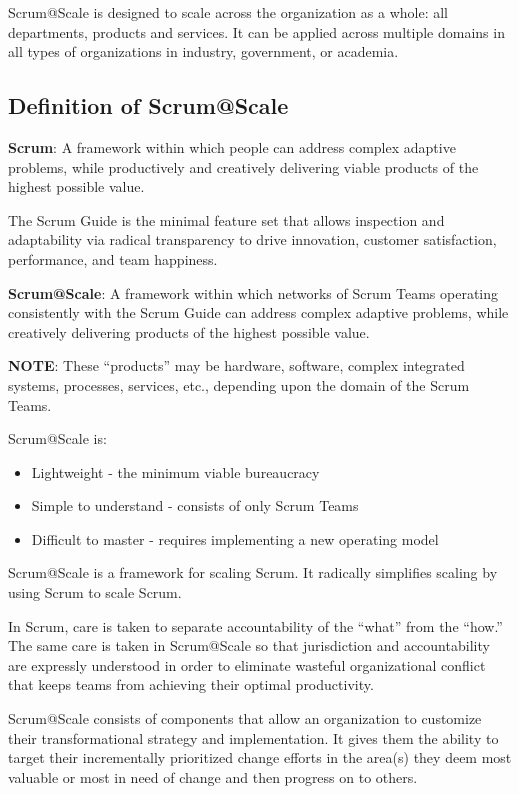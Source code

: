 \documentclass[12pt,a4paper,parskip=full]{scrartcl}
\begin{document}
Scrum@Scale is designed to scale across the organization as a whole: all departments, products and services. It can be applied across multiple domains in all types of organizations in industry, government, or academia.

\subsection{Definition of Scrum@Scale}

\textbf{Scrum}: A framework within which people can address complex adaptive problems, while productively and creatively delivering viable products of the highest possible value.

The Scrum Guide is the minimal feature set that allows inspection and adaptability via radical transparency to drive innovation, customer satisfaction, performance, and team happiness.

\textbf{Scrum@Scale}: A framework within which networks of Scrum Teams operating consistently with the Scrum Guide can address complex adaptive problems, while creatively delivering products of the highest possible value.

\textbf{NOTE}: These ``products'' may be hardware, software, complex integrated systems, processes, services, etc., depending upon the domain of the Scrum Teams.

Scrum@Scale is:
\begin{itemize}
	\item Lightweight - the minimum viable bureaucracy
	\item Simple to understand - consists of only Scrum Teams
	\item Difficult to master - requires implementing a new operating model
\end{itemize}

Scrum@Scale is a framework for scaling Scrum. It radically simplifies scaling by using Scrum to scale Scrum. 

In Scrum, care is taken to separate accountability of the ``what'' from the ``how.'' The same care is taken in Scrum@Scale so that jurisdiction and accountability are expressly understood in order to eliminate wasteful organizational conflict that keeps teams from achieving their optimal productivity.

Scrum@Scale consists of components that allow an organization to customize their transformational strategy and implementation. It gives them the ability to target their incrementally prioritized change efforts in the area(s) they deem most valuable or most in need of change and then progress on to others.
\end{document}
